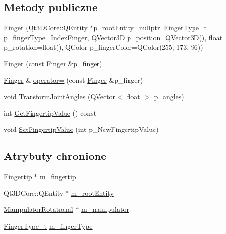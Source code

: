 \subsection*{Metody publiczne}
\begin{DoxyCompactItemize}
\item 
\hyperlink{class_finger_ad3fe31e788a2446cb0d1ed3252fb6215}{Finger} (Qt3\+D\+Core\+::\+Q\+Entity $\ast$p\+\_\+root\+Entity=nullptr, \hyperlink{class_finger_a365e6bba2e4877decf3c7641d29838c3}{Finger\+Type\+\_\+t} p\+\_\+finger\+Type=\hyperlink{class_finger_a365e6bba2e4877decf3c7641d29838c3a12cc2d85dc9a1a57ae93f22c1a8b94b4}{Index\+Finger}, Q\+Vector3D p\+\_\+position=Q\+Vector3D(), float p\+\_\+rotation=float(), Q\+Color p\+\_\+finger\+Color=Q\+Color(255, 173, 96))
\item 
\hyperlink{class_finger_af4d20d484850d7bc84c959f45578a27d}{Finger} (const \hyperlink{class_finger}{Finger} \&p\+\_\+finger)
\item 
\hyperlink{class_finger}{Finger} \& \hyperlink{class_finger_a09ecbb5c21531a771b9524dfcd49b6a6}{operator=} (const \hyperlink{class_finger}{Finger} \&p\+\_\+finger)
\item 
void \hyperlink{class_finger_a95a2e12235a97dec295aeb92c749ec06}{Transform\+Joint\+Angles} (Q\+Vector$<$ float $>$ p\+\_\+angles)
\item 
int \hyperlink{class_finger_a8b6275fb16f2066fae6a94702a5a7b92}{Get\+Fingertip\+Value} () const
\item 
void \hyperlink{class_finger_acb60693c51df450dc51796ec235894f9}{Set\+Fingertip\+Value} (int p\+\_\+\+New\+Fingertip\+Value)
\end{DoxyCompactItemize}
\subsection*{Atrybuty chronione}
\begin{DoxyCompactItemize}
\item 
\hyperlink{class_fingertip}{Fingertip} $\ast$ \hyperlink{class_finger_a50801f15bfee4cb547fa5062f6a57d78}{m\+\_\+fingertip}
\item 
Qt3\+D\+Core\+::\+Q\+Entity $\ast$ \hyperlink{class_finger_a1c86590c4074a394c323a0d3074c5ade}{m\+\_\+root\+Entity}
\item 
\hyperlink{class_manipulator_rotational}{Manipulator\+Rotational} $\ast$ \hyperlink{class_finger_a36de3642050edf81b7540fbf6687c9d7}{m\+\_\+manipulator}
\item 
\hyperlink{class_finger_a365e6bba2e4877decf3c7641d29838c3}{Finger\+Type\+\_\+t} \hyperlink{class_finger_aaf7978953c9c112ec568fa54c9110e41}{m\+\_\+finger\+Type}
\end{DoxyCompactItemize}


